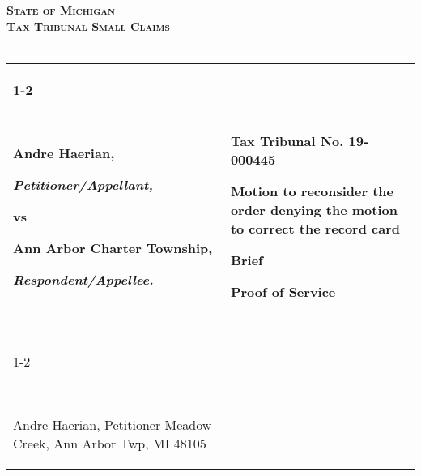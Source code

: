 \documentclass[12pt,\documentclassflag]{michiganCourtOfAppealsBrief}
\begin{document}





\begin{centering}
\bf\scshape State of Michigan\\Tax Tribunal Small Claims\\~\\ 
\rm 

\makeandtab
\setlength{\tabcolsep}{10pt}%
\begin{tabular}{p{} p{}}
\cline{1-2}
  {~

  \raggedright Andre Haerian,\par
  \hspace{.1\textwidth}\textit{Petitioner/Appellant,}
  \vspace{.4\baselineskip}\par
  vs\par
  \vspace{.4\baselineskip}
  \raggedright Ann Arbor Charter Township,\par
  \hspace{.1\textwidth}\textit{Respondent/Appellee.}
  
  ~} &  {~
       \par\par%
       \noindent Tax Tribunal No. 19-000445  \vspace{.5\baselineskip}\par
       \textbf{Motion to reconsider the order denying the motion to correct the record card}\vspace{.5\baselineskip}\par
       \textbf{Brief }\vspace{.5\baselineskip}\par
       \textbf{Proof of Service}\newline      
  ~}
  \\ \cline{1-2}\vspace{2mm}
  {~ \par
  Andre Haerian, Petitioner\newline
  390 Meadow Creek,\newline
  Ann Arbor Twp, MI 48105\newline \newline
  
}
\end{tabular}
\end{centering}
\end{document}
